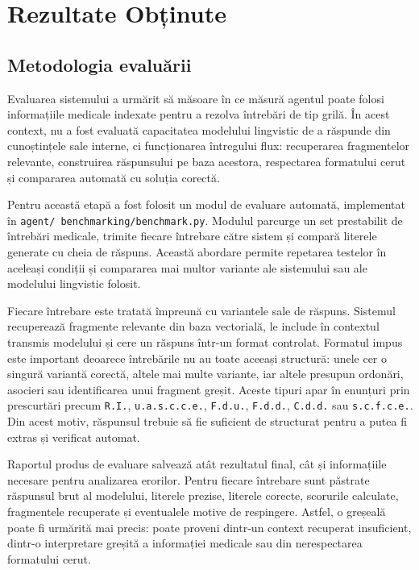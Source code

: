 \documentclass[12pt, a4paper, oneside, romanian]{teza-upb}
\begin{document}
\chapter{Rezultate Obținute}




  \section{Metodologia evaluării}

  Evaluarea sistemului a urmărit să măsoare în ce măsură agentul poate folosi informațiile medicale
  indexate pentru a rezolva întrebări de tip grilă. În acest context, nu a fost evaluată capacitatea
  modelului lingvistic de a răspunde din cunoștințele sale interne, ci funcționarea întregului flux:
  recuperarea fragmentelor relevante, construirea răspunsului pe baza acestora, respectarea
  formatului cerut și compararea automată cu soluția corectă.

  Pentru această etapă a fost folosit un modul de evaluare automată, implementat în \texttt{agent/
  benchmarking/benchmark.py}. Modulul parcurge un set prestabilit de întrebări medicale, trimite
  fiecare întrebare către sistem și compară literele generate cu cheia de răspuns. Această abordare
  permite repetarea testelor în aceleași condiții și compararea mai multor variante ale sistemului
  sau ale modelului lingvistic folosit.

  Fiecare întrebare este tratată împreună cu variantele sale de răspuns. Sistemul recuperează
  fragmente relevante din baza vectorială, le include în contextul transmis modelului și cere un
  răspuns într-un format controlat.   Formatul impus este important deoarece întrebările nu au toate aceeași structură: unele cer o
  singură variantă corectă, altele mai multe variante, iar altele presupun ordonări, asocieri sau
  identificarea unui fragment greșit. Aceste tipuri apar în enunțuri prin prescurtări precum
  \texttt{R.I.}, \texttt{u.a.s.c.c.e.}, \texttt{F.d.u.}, \texttt{F.d.d.}, \texttt{C.d.d.} sau
  \texttt{s.c.f.c.e.}. Din acest motiv, răspunsul trebuie să fie suficient de structurat pentru a
  putea fi extras și verificat automat.

  Raportul produs de evaluare salvează atât rezultatul final, cât și informațiile necesare pentru
  analizarea erorilor. Pentru fiecare întrebare sunt păstrate răspunsul brut al modelului, literele
  prezise, literele corecte, scorurile calculate, fragmentele recuperate și eventualele motive de
  respingere. Astfel, o greșeală poate fi urmărită mai precis: poate proveni dintr-un context
  recuperat insuficient, dintr-o interpretare greșită a informației medicale sau din nerespectarea
  formatului cerut.
\end{document}
